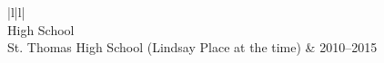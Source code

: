 \documentclass[10mm,letterpaper,notitlepage]{article}
\begin{document}
\begin{tblr}{|l|l|}
				\\\hline
					{ High School \\ St. Thomas High School (Lindsay Place at the time) }
					&
					2010–2015
				\\\hline
				\end{tblr}
			\setlength{\parindent}{\parindent-4mm}
\end{document}

